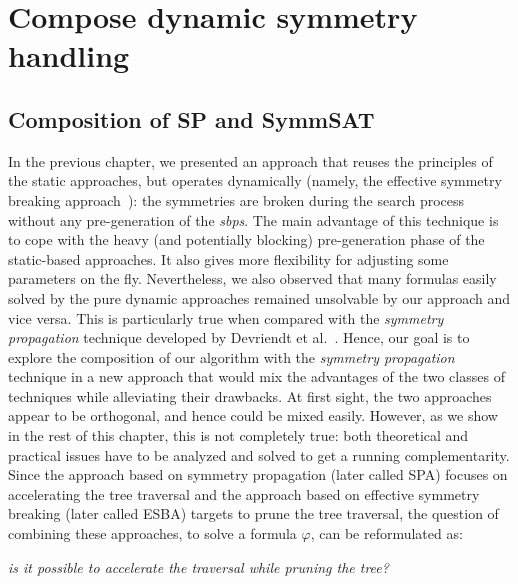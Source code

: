 ﻿\chapter{Compose dynamic symmetry handling}\label{chap:compose}
\minitoc
\section{Composition of SP and SymmSAT}
In the previous chapter, we presented an approach that reuses the
principles of the static approaches, but operates dynamically (namely, the effective symmetry breaking approach~\cite{metin2018cdclsym}):
 the symmetries are broken during the search process without any pre-generation of the \textit{sbps}. The main
advantage of this technique is to cope with the heavy (and potentially
blocking) pre-generation phase of the static-based approaches. It also gives
more flexibility for adjusting some parameters on the fly. 
Nevertheless, we also observed that many formulas easily solved by the pure
dynamic approaches remained unsolvable by our approach and vice versa. This is
particularly true when compared with the \textit{symmetry propagation} technique developed by
Devriendt et al.~\cite{Devriendt12}.
Hence, our goal is to explore the composition of our algorithm with the  \textit{symmetry propagation} technique in
a new approach that would mix the advantages of the two classes of techniques while alleviating their drawbacks. At first sight,
the two approaches appear to be orthogonal, and hence could be mixed easily. However, as we show in the rest of this chapter,
this is not completely true: both theoretical and practical issues have to be analyzed and solved to get a
running complementarity. 
Since the approach based on symmetry propagation (later called SPA) focuses on
accelerating the tree traversal and the approach based on effective symmetry
breaking (later called ESBA) targets to prune the tree traversal, the question of combining these approaches, to solve a formula $\varphi$, can
be reformulated as: 
\begin{center}
 \textit{is it possible to accelerate the traversal while pruning the tree?}
\end{center}
